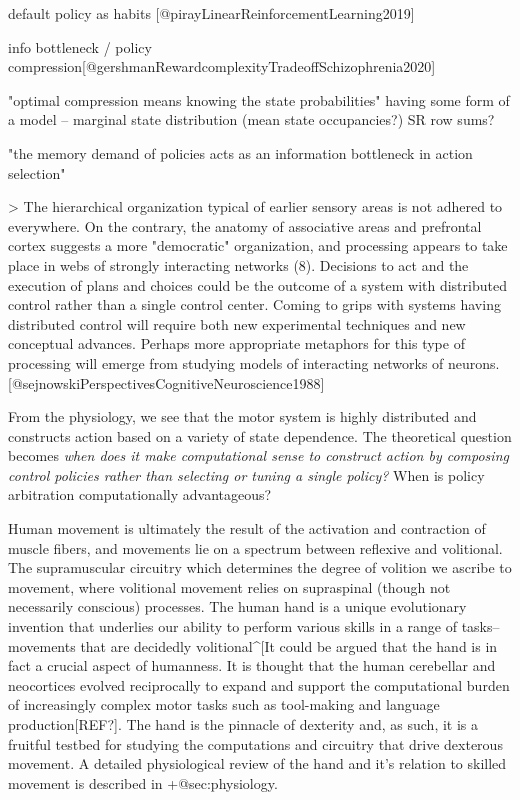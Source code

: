 \documentclass[../main.tex]{subfiles}
\begin{document}
default policy as habits [@pirayLinearReinforcementLearning2019]

info bottleneck / policy compression[@gershmanRewardcomplexityTradeoffSchizophrenia2020] 

"optimal compression means knowing the state probabilities"
having some form of a model -- marginal state distribution (mean state occupancies?) SR row sums?

"the memory demand of policies acts as an information bottleneck in action selection"

> The hierarchical organization typical of earlier sensory areas is not adhered to everywhere. On the contrary, the anatomy of associative areas and prefrontal  cortex suggests a more "democratic"  organization, and  processing  appears to take place  in webs of strongly interacting networks (8). Decisions to act and the execution of plans and  choices  could be the outcome of a  system with  distributed control rather than  a single control center. Coming to grips  with systems having distributed control will require both new experimental techniques and new  conceptual advances. Perhaps more  appropriate  metaphors for this  type of processing will emerge from studying  models of interacting  networks of neurons. [@sejnowskiPerspectivesCognitiveNeuroscience1988]

From the physiology, we see that the motor system is highly distributed
and constructs action based on a variety of state dependence. The
theoretical question becomes \emph{when does it make computational sense
to construct action by composing control policies rather than selecting
or tuning a single policy?} When is policy arbitration computationally
advantageous?

Human movement is ultimately the result of the activation and contraction of muscle fibers, and movements lie on a spectrum between reflexive and volitional. The supramuscular circuitry which determines the degree of volition we ascribe to movement, where volitional movement relies on supraspinal (though not necessarily conscious) processes. The human hand is a unique evolutionary invention that underlies our ability to perform various skills in a range of tasks-- movements that are decidedly volitional^[It could be argued that the hand is in fact a crucial aspect of humanness. It is thought that the human cerebellar and neocortices evolved reciprocally to expand and support the computational burden of increasingly complex motor tasks such as tool-making and language production[REF?]. The hand is the pinnacle of dexterity and, as such, it is a fruitful testbed for studying the computations and circuitry that drive dexterous movement. A detailed physiological review of the hand and it's relation to skilled movement is described in {+@sec:physiology}.
\end{document}

